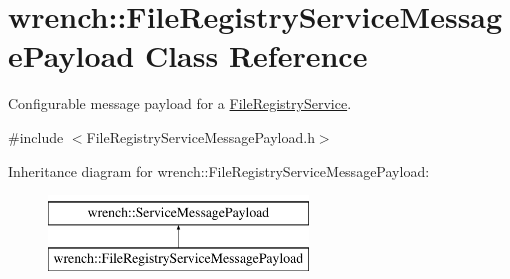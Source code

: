 \hypertarget{classwrench_1_1_file_registry_service_message_payload}{}\section{wrench\+:\+:File\+Registry\+Service\+Message\+Payload Class Reference}
\label{classwrench_1_1_file_registry_service_message_payload}


Configurable message payload for a \hyperlink{classwrench_1_1_file_registry_service}{File\+Registry\+Service}.  




{\ttfamily \#include $<$File\+Registry\+Service\+Message\+Payload.\+h$>$}

Inheritance diagram for wrench\+:\+:File\+Registry\+Service\+Message\+Payload\+:\begin{figure}[H]
\begin{center}
\leavevmode
\includegraphics[height=2.000000cm]{classwrench_1_1_file_registry_service_message_payload}
\end{center}
\end{figure}

